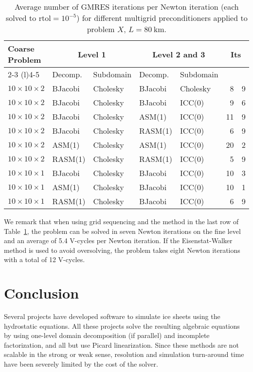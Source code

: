 \begin{table}
  \centering\caption{Average number of GMRES iterations per Newton iteration (each solved to $\mathrm{rtol} = 10^{-5}$) for different multigrid preconditioners applied to problem $X$, $L=\SI{80}{\kilo\metre}$.}\label{tab:xmg}
  \begin{tabular}{l ll ll r@{.}l}
    \toprule
    \multirow{3}{*}{Coarse Problem} & \multicolumn{2}{c}{Level 1} & \multicolumn{2}{c}{Level 2 and 3} & \multicolumn{2}{c}{\multirow{3}{*}{Its}} \\
    \cmidrule(r){2-3} \cmidrule(l){4-5}
                                   & Decomp. & Subdomain & Decomp. & Subdomain         \\
    \midrule
    $10\times 10\times 2$    & BJacobi & Cholesky & BJacobi & Cholesky & 8  & 9 \\
    $10\times 10\times 2$    & BJacobi & Cholesky & BJacobi & ICC(0)   & 9  & 6 \\
    $10\times 10\times 2$    & BJacobi & Cholesky & ASM(1)  & ICC(0)   & 11 & 9 \\
    $10\times 10\times 2$    & BJacobi & Cholesky & RASM(1) & ICC(0)   & 6  & 9 \\
    $10\times 10\times 2$    & ASM(1)  & Cholesky & ASM(1)  & ICC(0)   & 20 & 2 \\
    $10\times 10\times 2$    & RASM(1) & Cholesky & RASM(1) & ICC(0)   & 5  & 9 \\
    $10\times 10\times 1$    & BJacobi & Cholesky & BJacobi & ICC(0)   & 10 & 3 \\
    $10\times 10\times 1$    & ASM(1)  & Cholesky & BJacobi & ICC(0)   & 10 & 1 \\
    $10\times 10\times 1$    & RASM(1) & Cholesky & BJacobi & ICC(0)   & 6  & 9 \\
    \bottomrule
  \end{tabular}
\end{table}

We remark that when using grid sequencing and the method in the last row of Table~\ref{tab:xmg}, the problem can be solved in seven Newton iterations on the fine level and an average of 5.4 V-cycles per Newton iteration.
If the Eisenstat-Walker method is used to avoid oversolving, the problem takes eight Newton iterations with a total of 12 V-cycles.

\section{Conclusion}
Several projects \citep{lemieux2011jfnk,issm:homepage,johnson2007modeling,desmedt2010using,pattyn2003ntd} have developed software to simulate ice sheets using the hydrostatic equations.
All these projects solve the resulting algebraic equations by using one-level domain decomposition (if parallel) and incomplete factorization, and all but \citep{lemieux2011jfnk} use Picard linearization.
Since these methods are not scalable in the strong or weak sense, resolution and simulation turn-around time have been severely limited by the cost of the solver.

